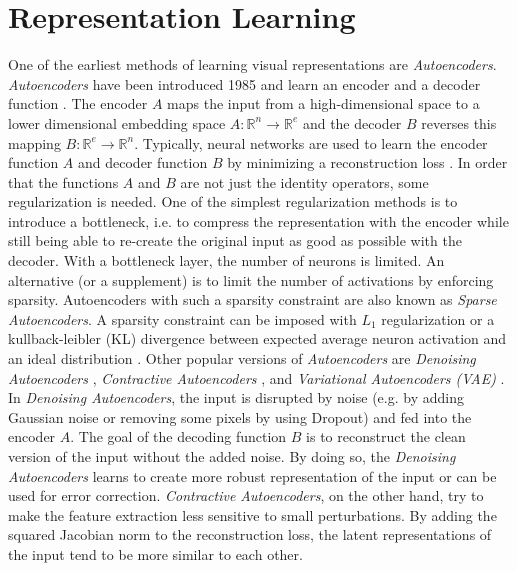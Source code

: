 \section{Representation Learning}
One of the earliest methods of learning visual representations are \emph{Autoencoders}.
\emph{Autoencoders} have been introduced 1985  and learn an encoder and a decoder function .
The encoder $A$ maps the input from a high-dimensional space to a lower dimensional embedding space $A: \mathbb{R}^{n} \rightarrow \mathbb{R}^{e}$ and the decoder $B$ reverses this mapping $B: \mathbb{R}^{e} \rightarrow \mathbb{R}^{n}$.
Typically, neural networks are used to learn the encoder function $A$ and decoder function $B$ by minimizing a reconstruction loss .
In order that the functions $A$ and $B$ are not just the identity operators, some regularization is needed.
One of the simplest regularization methods is to introduce a bottleneck, i.e. to compress the representation with the encoder while still being able to re-create the original input as good as possible with the decoder.
With a bottleneck layer, the number of neurons is limited.
An alternative (or a supplement) is to limit the number of activations by enforcing sparsity.
Autoencoders with such a sparsity constraint are also known as \emph{Sparse Autoencoders}.
A sparsity constraint can be imposed with $L_1$ regularization or a kullback-leibler (KL) divergence between expected average neuron activation and an ideal distribution .
Other popular versions of \emph{Autoencoders} are \emph{Denoising Autoencoders} , \emph{Contractive Autoencoders} , and \emph{Variational Autoencoders (VAE)} .
In \emph{Denoising Autoencoders}, the input is disrupted by noise (e.g. by adding Gaussian noise or removing some pixels by using Dropout) and fed into the encoder $A$.
The goal of the decoding function $B$ is to reconstruct the clean version of the input without the added noise.
By doing so, the \emph{Denoising Autoencoders} learns to create more robust representation of the input or can be used for error correction.
\emph{Contractive Autoencoders}, on the other hand, try to make the feature extraction less sensitive to small perturbations.
By adding the squared Jacobian norm to the reconstruction loss, the latent representations of the input tend to be more similar to each other.

